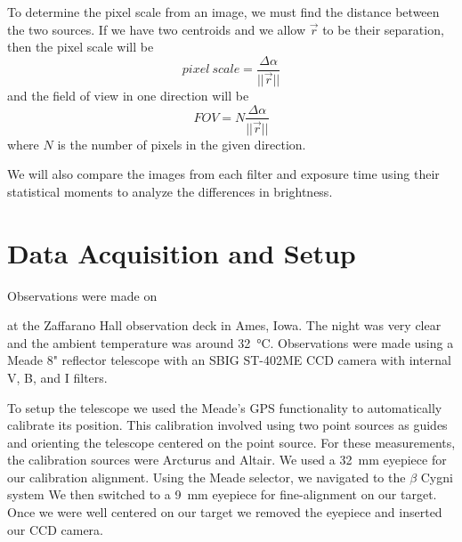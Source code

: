 \documentclass[%
aip,
jmp,
reprint,
floatfix,
nobibfootnote,
]{revtex4-1}
\begin{document}
	To determine the pixel scale from an image, we must find the distance between the two sources. If we have two centroids and we allow $\vec{r}$ to be their separation, then the pixel scale will be
	\begin{equation}
		pixel\ scale = \frac{\Delta\alpha}{||\vec{r}||}
		\label{eqn:pscale}
	\end{equation}
	and the field of view in one direction will be 
	\begin{equation}
		FOV = N \frac{\Delta\alpha}{||\vec{r}||}
		\label{eqn:fov}
	\end{equation}
	where $N$ is the number of pixels in the given direction.
	
	We will also compare the images from each filter and exposure time using their statistical moments to analyze the differences in brightness.
	


	\section{Data Acquisition and Setup}
	Observations were made on \date{30 August 2017} at the Zaffarano Hall observation deck in Ames, Iowa. The night was very clear and the ambient temperature was around \SI{32}{\degreeCelsius}. Observations were made using a Meade 8" reflector telescope with an SBIG ST-402ME CCD camera with internal V, B, and I filters. 
	
	To setup the telescope we used the Meade's GPS functionality to automatically calibrate its position. This calibration involved using two point sources as guides and orienting the telescope centered on the point source. For these measurements, the calibration sources were Arcturus and Altair. We used a \SI{32}{\milli\meter} eyepiece for our calibration alignment. Using the Meade selector, we navigated to the $\beta$ Cygni system We then switched to a \SI{9}{\milli\meter} eyepiece for fine-alignment on our target. Once we were well centered on our target we removed the eyepiece and inserted our CCD camera.
	
\end{document}
